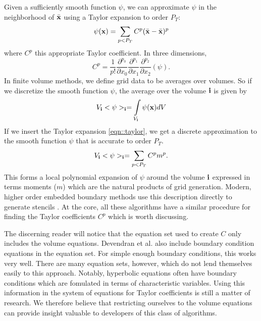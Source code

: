 \documentclass{article}
\newcommand{\ibold}{{\bf i}}
\newcommand{\xbold}{{\bf x}}
\newcommand{\xbar}{{\bar {\bf x}}}
\begin{document}
 
Given a sufficiently smooth function $\psi$, we can approximate $\psi$
in the neighborhood of $\xbar$ using a Taylor expansion to order $P_T$:
\begin{equation}
\psi(\xbold)  =  \sum\limits_{p < P_T} C^p (\xbar -
\xbar)^p \label{eqn::taylor}
\label{eqn::taylor}
\end{equation}
where $C^p$ this appropriate Taylor coefficient.  In three dimensions,
\begin{equation}
  C^p =\frac{1}{p!}
      \frac{\partial^{p_0}}{\partial x_0}
      \frac{\partial^{p_1}}{\partial x_1}
      \frac{\partial^{p_2}}{\partial x_2}  (\psi).
\end{equation}  
In finite volume  methods, we define grid data to be
averages over volumes.   So if we discretize the smooth function
$\psi$, the average over the volume $\ibold$ is given by
\begin{equation*}
 V_\ibold <\psi>_\ibold = \int\limits_{V_\ibold} \psi(\xbold) dV
\end{equation*}
If we insert the Taylor expansion \ref{eqn::taylor}, we get a discrete
approximation to the smooth function $\psi$ that is accurate to order $P_T$.
\begin{equation*}
 V_\ibold <\psi>_\ibold = \sum\limits_{p < P_T} C^p m^p. 
\end{equation*}
This forms a local polynomial expansion of $\psi$ around the volume
$\ibold$ expressed in terms moments ($m$) which are the natural
products of grid generation.  Modern, higher order embedded boundary
methods use this description directly to generate stencils
\cite{Overton2022a, Devendran2017, Schwartz2015}.  At the
core, all these algorithms have a similar procedure for finding the
Taylor coefficients $C^p$ which is worth discussing. 

The discerning reader will notice that
the equation set used to create $C$ only includes the volume
equations.  Devendran et al. \cite{Devendran2017} also include boundary
condition equations in the equation set.  For simple enough boundary
conditions, this works very well.  There are many equation sets,
however, which do not lend themselves easily to this approach.
Notably, hyperbolic equations often have boundary conditions which are
fomulated in terms of characteristic variables.  Using this
information in the system of equations for Taylor coefficients is
still a matter of research.  We therefore believe that restricting
ourselves to the volume equations can provide insight valuable to
developers of this class of algorithms.
\end{document}

